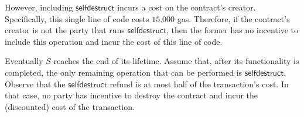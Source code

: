 However, including $\mathsf{selfdestruct}$ incurs a cost on the contract's
creator. Specifically, this single line of code costs $15.000$ gas. Therefore,
if the contract's creator is not the party that runs $\mathsf{selfdestruct}$,
then the former has no incentive to include this operation and incur the cost
of this line of code.

Eventually $S$ reaches the end of its lifetime. Assume that, after its
functionality is completed, the only remaining operation that can be performed
is $\mathsf{selfdestruct}$. Observe that the $\mathsf{selfdestruct}$ refund is
at most half of the transaction's cost. In that case, no party has incentive to
destroy the contract and incur the (discounted) cost of the transaction.
